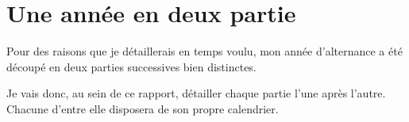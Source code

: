 \chapter{Une année en deux partie}
Pour des raisons que je détaillerais en temps voulu, mon année d'alternance a été découpé en deux parties successives bien distinctes.

Je vais donc, au sein de ce rapport, détailler chaque partie l'une après l'autre. Chacune d'entre elle disposera de son propre calendrier.
